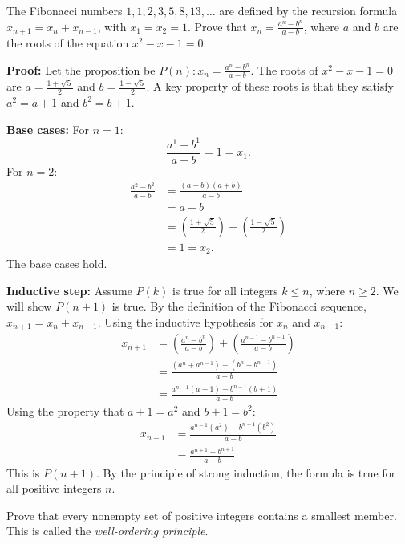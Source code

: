 \begin{problembox}
The Fibonacci numbers $1, 1, 2, 3, 5, 8, 13, \dots$ are defined by the recursion formula $x_{n+1} = x_n + x_{n-1}$, with $x_1 = x_2 = 1$. Prove that $x_n = \frac{a^n - b^n}{a - b}$, where $a$ and $b$ are the roots of the equation $x^2 - x - 1 = 0$.
\end{problembox}

\textbf{Proof:}
Let the proposition be $P(n): x_n = \frac{a^n - b^n}{a-b}$. The roots of $x^2 - x - 1 = 0$ are $a = \frac{1+\sqrt{5}}{2}$ and $b = \frac{1-\sqrt{5}}{2}$.
A key property of these roots is that they satisfy $a^2 = a+1$ and $b^2 = b+1$.

\textbf{Base cases:}
For $n=1$:
\[ \frac{a^1 - b^1}{a-b} = 1 = x_1. \]
For $n=2$:
\begin{align*}
\frac{a^2 - b^2}{a-b} &= \frac{(a-b)(a+b)}{a-b}\\
&= a+b\\
&= \left(\frac{1+\sqrt{5}}{2}\right) + \left(\frac{1-\sqrt{5}}{2}\right)\\
&= 1 = x_2.
\end{align*}
The base cases hold.

\textbf{Inductive step:}
Assume $P(k)$ is true for all integers $k \leq n$, where $n \geq 2$. We will show $P(n+1)$ is true.
By the definition of the Fibonacci sequence, $x_{n+1} = x_n + x_{n-1}$.
Using the inductive hypothesis for $x_n$ and $x_{n-1}$:
\begin{align*}
x_{n+1} &= \left( \frac{a^n - b^n}{a-b} \right) + \left( \frac{a^{n-1} - b^{n-1}}{a-b} \right) \\
&= \frac{(a^n + a^{n-1}) - (b^n + b^{n-1})}{a-b} \\
&= \frac{a^{n-1}(a+1) - b^{n-1}(b+1)}{a-b}
\end{align*}
Using the property that $a+1 = a^2$ and $b+1 = b^2$:
\begin{align*}
x_{n+1} &= \frac{a^{n-1}(a^2) - b^{n-1}(b^2)}{a-b} \\
&= \frac{a^{n+1} - b^{n+1}}{a-b}
\end{align*}
This is $P(n+1)$. By the principle of strong induction, the formula is true for all positive integers $n$.

\begin{problembox}
Prove that every nonempty set of positive integers contains a smallest member. This is called the \textit{well-ordering principle}.
\end{problembox}

